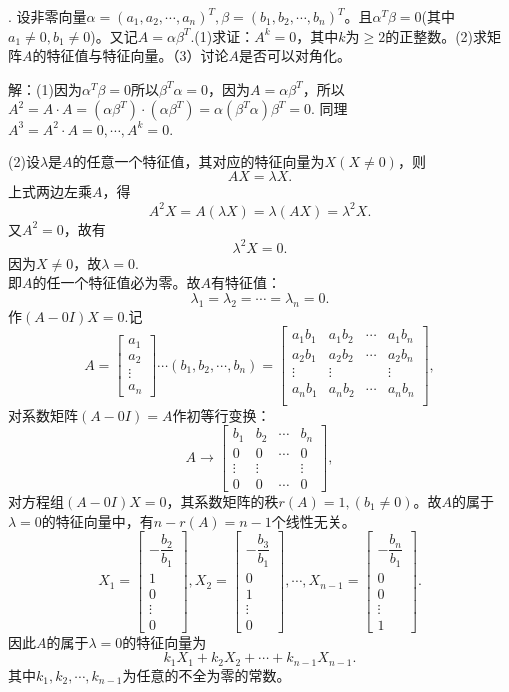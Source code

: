 \documentclass[10pt,twocolumn,letterpaper]{article}
\theoremstyle{mythmstyle}
\begin{document}
\vspace{1em}
. 设非零向量$\alpha=(a_1,a_2,\cdots,a_n)^T,\beta=(b_1,b_2,\cdots,b_n)^T$。且$\alpha^T\beta=0$(其中$a_1\neq 0,b_1\neq 0$)。又记$A=\alpha\beta^T$.(1)求证：$A^k=0$，其中$k$为$\geq 2$的正整数。(2)求矩阵$A$的特征值与特征向量。（3）讨论$A$是否可以对角化。

\noindent 解：(1)因为$\alpha^T\beta=0$所以$\beta^T\alpha=0$，因为$A=\alpha\beta^T$，所以$A^2=A\cdot A=(\alpha\beta^T)\cdot(\alpha\beta^T)=\alpha(\beta^T\alpha)\beta^T=0$. 同理$A^3=A^2\cdot A=0,\cdots,A^k=0.$

(2)设$\lambda$是$A$的任意一个特征值，其对应的特征向量为$X(X\neq 0)$，则
$$AX=\lambda X.$$
上式两边左乘$A$，得
$$A^2X=A(\lambda X)=\lambda (AX)=\lambda^2 X.$$
又$A^2=0$，故有
$$\lambda^2X=0.$$
因为$X\neq 0$，故$\lambda=0.$\\
即$A$的任一个特征值必为零。故$A$有特征值：
$$\lambda_1=\lambda_2=\cdots=\lambda_n=0.$$
作$(A-0I)X=0.$记
$$A=\begin{bmatrix}
a_1\\a_2\\\vdots\\a_n
\end{bmatrix}\cdots
(b_1,b_2,\cdots,b_n)=
\begin{bmatrix}
a_1b_1&a_1b_2&\cdots&a_1b_n\\
a_2b_1&a_2b_2&\cdots&a_2b_n\\
\vdots&\vdots&&\vdots\\
a_nb_1&a_nb_2&\cdots&a_nb_n\\
\end{bmatrix},
$$
对系数矩阵$(A-0I)=A$作初等行变换：
$$A\rightarrow 
\begin{bmatrix}
b_1&b_2&\cdots&b_n\\
0&0&\cdots&0\\
\vdots&\vdots&&\vdots\\
0&0&\cdots&0
\end{bmatrix},
$$
对方程组$(A-0I)X=0$，其系数矩阵的秩$r(A)=1,(b_1\neq 0)$。故$A$的属于$\lambda=0$的特征向量中，有$n-r(A)=n-1$个线性无关。
$$
X_1=\begin{bmatrix}
-\dfrac{b_2}{b_1}\\1\\0\\\vdots\\0
\end{bmatrix},
X_2=\begin{bmatrix}
-\dfrac{b_3}{b_1}\\0\\1\\\vdots\\0
\end{bmatrix},
\cdots,
X_{n-1}=\begin{bmatrix}
-\dfrac{b_n}{b_1}\\0\\0\\\vdots\\1
\end{bmatrix}.
$$
因此$A$的属于$\lambda=0$的特征向量为
$$k_1X_1+k_2X_2+\cdots+k_{n-1}X_{n-1}.$$
其中$k_1,k_2,\cdots ,k_{n-1}$为任意的不全为零的常数。
\end{document}
